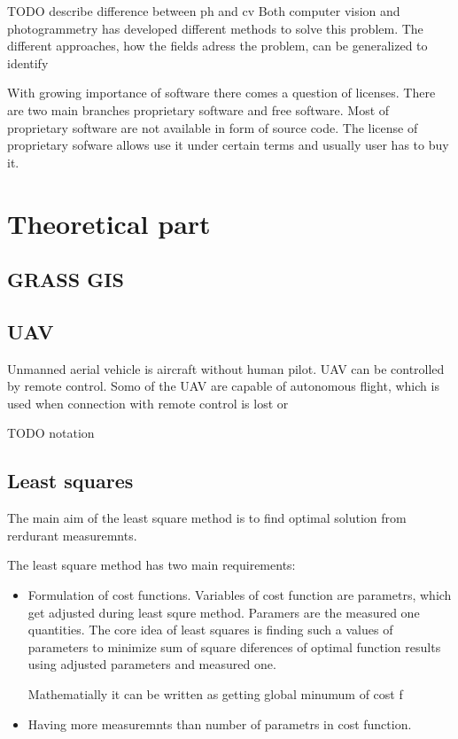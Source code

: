 \documentclass[a4paper,12pt]{report}
\begin{document}
TODO describe difference between ph and cv
Both computer vision and photogrammetry has developed different methods to solve this problem.
The different approaches, how the fields adress the problem, can be generalized to identify 


With growing importance of software there comes a question of licenses. There are two 
main branches proprietary software and free software. Most of proprietary software are not available in 
form of source code. The license of proprietary sofware allows use it under certain terms and usually user 
has to buy it.


\newpage

\chapter{Theoretical part}


\section{GRASS GIS}

\section{UAV}

Unmanned aerial vehicle is aircraft without human pilot. UAV can be controlled by remote control.
Somo of the UAV are capable of autonomous flight, which is used when connection with remote control is 
lost or 

TODO notation

\section{Least squares}
\label{sec:least}


The main aim of the least square method is to find optimal solution from rerdurant measuremnts.


The least square method has two main requirements:
\begin{itemize}
\item Formulation of cost functions. Variables of cost function are parametrs, which get adjusted 
      during least squre method. Paramers are the measured one quantities.
      The core idea of least squares is finding such a values of parameters to minimize sum 
      of square diferences of optimal function results using adjusted parameters and measured one.
      
      Mathematially it can be written as getting global minumum of cost f 
      
\item Having more measuremnts than number of parametrs in cost function.

\end{itemize}
\end{document}
